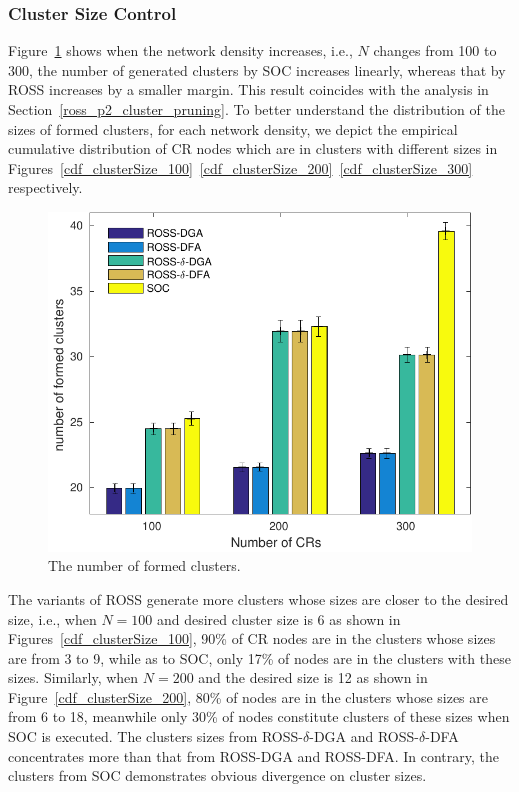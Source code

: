 \documentclass[times]{ettauth}
\newcommand{\ie}{i.e., }
\theoremstyle{mytheoremstyle}
\theoremstyle{mytheoremstyle}
\theoremstyle{mytheoremstyle}
\begin{document}
\subsubsection{Cluster Size Control}
Figure~\ref{nClusters_largeNetwork} shows when the network density increases, \ie $N$ changes from 100 to 300, the number of generated clusters by SOC increases linearly, whereas that by ROSS increases by a smaller margin.
This result coincides with the analysis in Section~\ref{ross_p2_cluster_pruning}.
To better understand the distribution of the sizes of formed clusters, for each network density, we depict the empirical cumulative distribution of CR nodes which are in clusters with different sizes in Figures~\ref{cdf_clusterSize_100}~\ref{cdf_clusterSize_200}~\ref{cdf_clusterSize_300} respectively.
\begin{figure}[!h]
  \centering
   \includegraphics[width=0.7\linewidth]{nClusters_largeNetwork_no_texture.pdf}
  \caption{The number of formed clusters.}
  \label{nClusters_largeNetwork}
\end{figure}

The variants of ROSS generate more clusters whose sizes are closer to the desired size, \ie when $N=100$ and desired cluster size is 6 as shown in Figures~\ref{cdf_clusterSize_100}, 90\% of CR nodes are in the clusters whose sizes are from 3 to 9, while as to SOC, only 17\% of nodes are in the clusters with these sizes.
Similarly, when $N=200$ and the desired size is 12 as shown in Figure~\ref{cdf_clusterSize_200}, 80\% of nodes are in the clusters whose sizes are from 6 to 18, meanwhile only 30\% of nodes constitute clusters of these sizes when SOC is executed.
The clusters sizes from ROSS-$\delta$-DGA and ROSS-$\delta$-DFA concentrates more than that from ROSS-DGA and ROSS-DFA.
In contrary, the clusters from SOC demonstrates obvious divergence on cluster sizes.
\end{document}
